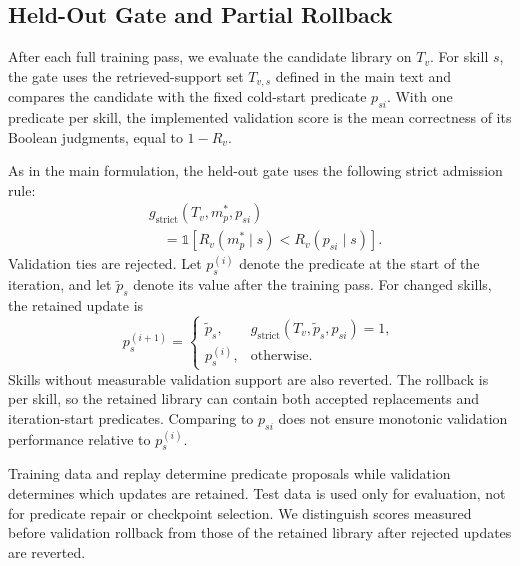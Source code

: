 \subsection{Held-Out Gate and Partial Rollback}
\label{app:procedure-validation}
After each full training pass, we evaluate the candidate library on $T_v$. For skill $s$, the gate uses the retrieved-support set $T_{v,s}$ defined in the main text and compares the candidate with the fixed cold-start predicate $p_{si}$. With one predicate per skill, the implemented validation score is the mean correctness of its Boolean judgments, equal to $1-R_v$.

As in the main formulation, the held-out gate uses the following strict admission rule:
\[
\begin{aligned}
&g_{\mathrm{strict}}(T_v,m_p^*,p_{si})\\
&\quad=\mathds{1}[R_v(m_p^*\mid s)<R_v(p_{si}\mid s)].
\end{aligned}
\]
Validation ties are rejected. Let $p_s^{(i)}$ denote the predicate at the start of the iteration, and let $\widetilde p_s$ denote its value after the training pass. For changed skills, the retained update is
\[
p_s^{(i+1)}=\begin{cases}
\widetilde p_s,&g_{\mathrm{strict}}(T_v,\widetilde p_s,p_{si})=1,\\
p_s^{(i)},&\text{otherwise}.
\end{cases}
\]
Skills without measurable validation support are also reverted. The rollback is per skill, so the retained library can contain both accepted replacements and iteration-start predicates. Comparing to $p_{si}$ does not ensure monotonic validation performance relative to $p_s^{(i)}$.

Training data and replay determine predicate proposals while validation determines which updates are retained. Test data is used only for evaluation, not for predicate repair or checkpoint selection. We distinguish scores measured before validation rollback from those of the retained library after rejected updates are reverted.